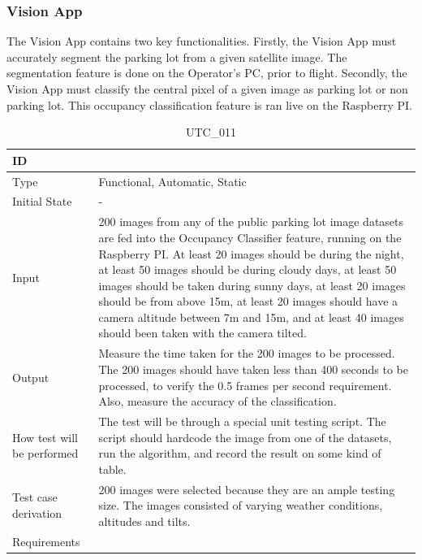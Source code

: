 \documentclass[12pt, titlepage]{article}
\begin{document}
\clearpage

\subsubsection{Vision App}

The Vision App contains two key functionalities. Firstly, the Vision App must accurately segment the parking lot from a given satellite image. The segmentation feature is done on the Operator's PC, prior to flight. Secondly, the Vision App must classify the central pixel of a given image as parking lot or non parking lot. This occupancy classification feature is ran live on the Raspberry PI.  

\begin{table}[!h]
\begin{center}
\caption {UTC\_011}
\label{tab:UTC_011}
\begin{tabular}{ | m{3.2cm} | m{12.2cm} | } 
\hline
ID & \nameref{tab:UTC_011} \\ 
\hline
Type &  Functional, Automatic, Static  \\ 
\hline
Initial State & -\\ 
\hline
Input &  200 images from any of the public parking lot image datasets are fed into the Occupancy Classifier feature, running on the Raspberry PI. At least 20 images should be during the night, at least 50 images should be during cloudy days, at least 50 images should be taken during sunny days, at least 20 images should be from above 15m, at least 20 images should have a camera altitude between 7m and 15m, and at least 40 images should been taken with the camera tilted.\\ 
\hline
Output &  Measure the time taken for the 200 images to be processed. The 200 images should have taken less than 400 seconds to be processed, to verify the 0.5 frames per second requirement. Also, measure the accuracy of the classification. \\ 
\hline
How test will be performed & The test will be through a special unit testing script. The script should hardcode the image from one of the datasets, run the algorithm, and record the result on some kind of table. \\ 
\hline
Test case derivation & 200 images were selected because they are an ample testing size. The images consisted of varying weather conditions, altitudes and tilts.  \\ 
\hline
Requirements & \nameref{GEN_005} \\ 
\hline
\end{tabular}
\end{center}
\end{table}
\end{document}
